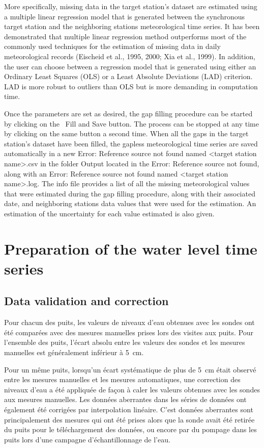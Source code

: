 \documentclass[12pt, letterpaper, fleqn]{report}
\begin{document}
More specifically, missing data in the target station's dataset are estimated using a multiple linear regression model that is generated between the synchronous target station and the neighboring stations meteorological time series. It has been demonstrated that multiple linear regression method outperforms most of the commonly used techniques for the estimation of missing data in daily meteorological records (Eischeid et al., 1995, 2000; Xia et al., 1999). In addition, the user can choose between a regression model that is generated using either an Ordinary Least Squares (OLS) or a Least Absolute Deviations (LAD) criterion. LAD is more robust to outliers than OLS but is more demanding in computation time.

Once the parameters are set as desired, the gap filling procedure can be started by clicking on the        Fill and Save button. The process can be stopped at any time by clicking on the same button a second time. When all the gaps in the target station's dataset have been filled, the gapless meteorological time series are saved automatically in a new Error: Reference source not found named <target station name>.csv in the folder Output located in the Error: Reference source not found, along with an Error: Reference source not found named <target station name>.log. The info file provides a list of all the missing meteorological values that were estimated during the gap filling procedure, along with their associated date, and neighboring stations data values that were used for the estimation. An estimation of the uncertainty for each value estimated is also given.

\section{Preparation of the water level time series}

\subsection{Data validation and correction}

Pour chacun des puits, les valeurs de niveaux d’eau obtenues avec les sondes ont été comparées avec des mesures manuelles prises lors des visites aux puits. Pour l’ensemble des puits, l’écart absolu entre les valeurs des sondes et les mesures manuelles est généralement inférieur à 5 cm.

Pour un même puits, lorsqu'un écart systématique de plus de 5 cm était observé entre les mesures manuelles et les mesures automatiques, une correction des niveaux d’eau a été  appliquée de façon à caler les valeurs obtenues avec les sondes aux mesures manuelles.
Les données aberrantes dans les séries de données ont également été corrigées par interpolation linéaire. C’est données aberrantes sont principalement des mesures qui ont été prises alors que la sonde avait été retirée du puits pour le téléchargement des données, ou encore par du pompage dans les puits lors d’une campagne d’échantillonnage de l’eau.
\end{document}
